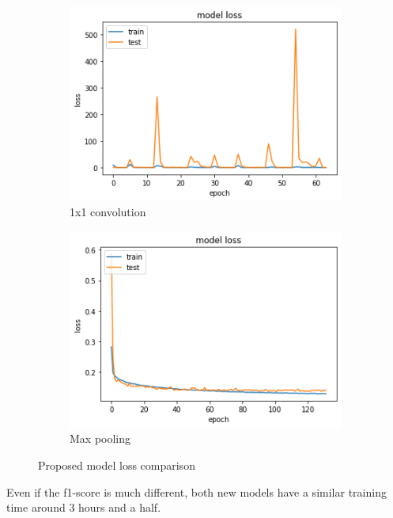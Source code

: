 \documentclass{article}
\begin{document}
\begin{figure}[H]
	\centering
	\begin{subfigure}{.5\textwidth}
		\centering
		\includegraphics[width=.9\linewidth]{./images/poly/new model_loss.png}
		\caption{1x1 convolution}
	\end{subfigure}%
	\begin{subfigure}{.5\textwidth}
		\centering
		\includegraphics[width=.9\linewidth]{./images/poly/new model_loss_new.png}
		\caption{Max pooling}
	\end{subfigure}
	\caption{Proposed model loss comparison}
	\label{fig:poly_new_loss}
\end{figure}

Even if the f1-score is much different, both new models have a similar training time around 3 hours and a half.
\end{document}
